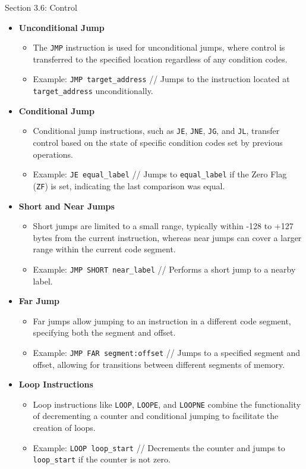 \begin{notes}{Section 3.6: Control}
    \begin{itemize}
        \item \textbf{Unconditional Jump}
        \begin{itemize}
            \item The \texttt{JMP} instruction is used for unconditional jumps, where control is transferred to the specified location regardless of any condition codes.
            \item Example: \texttt{JMP target\_address} // Jumps to the instruction located at \texttt{target\_address} unconditionally.
        \end{itemize}
        \item \textbf{Conditional Jump}
        \begin{itemize}
            \item Conditional jump instructions, such as \texttt{JE}, \texttt{JNE}, \texttt{JG}, and \texttt{JL}, transfer control based on the state of specific condition codes set by previous operations.
            \item Example: \texttt{JE equal\_label} // Jumps to \texttt{equal\_label} if the Zero Flag (\texttt{ZF}) is set, indicating the last comparison was equal.
        \end{itemize}
        \item \textbf{Short and Near Jumps}
        \begin{itemize}
            \item Short jumps are limited to a small range, typically within -128 to +127 bytes from the current instruction, whereas near jumps can cover a larger range within the current code segment.
            \item Example: \texttt{JMP SHORT near\_label} // Performs a short jump to a nearby label.
        \end{itemize}
        \item \textbf{Far Jump}
        \begin{itemize}
            \item Far jumps allow jumping to an instruction in a different code segment, specifying both the segment and offset.
            \item Example: \texttt{JMP FAR segment:offset} // Jumps to a specified segment and offset, allowing for transitions between different segments of memory.
        \end{itemize}
        \item \textbf{Loop Instructions}
        \begin{itemize}
            \item Loop instructions like \texttt{LOOP}, \texttt{LOOPE}, and \texttt{LOOPNE} combine the functionality of decrementing a counter and conditional jumping to facilitate the creation of loops.
            \item Example: \texttt{LOOP loop\_start} // Decrements the counter and jumps to \texttt{loop\_start} if the counter is not zero.
        \end{itemize}
    \end{itemize}
    

\end{notes}

